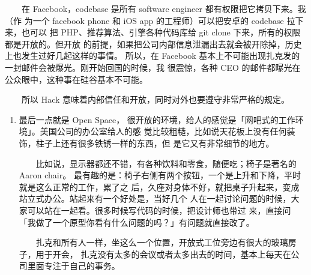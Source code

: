 \documentclass[11pt]{ctexart}
\begin{document}
　　在 Facebook，codebase 是所有 software engineer 都有权限把它拷贝下来。我（作
为一个 facebook phone 和 iOS app 的工程师）可以把安卓的 codebase 拉下来，也可以
把 PHP、推荐算法、引擎各种代码库给 git clone 下来，所有的权限都是开放的。但开放
的前提，如果把公司内部信息泄漏出去就会被开除掉，历史上也发生过好几起这样的事情。
所以，在 Facebook 基本上不可能出现扎克发的一封邮件会被爆光。刚开始回国的时候，我
很震惊，各种 CEO 的邮件都曝光在公众眼中，这种事在硅谷基本不可能。

　　所以 Hack 意味着内部信任和开放，同时对外也要遵守非常严格的规定。

\begin{enumerate}
\item 最后一点就是 Open Space，
\label{sec:orgheadline15}
很开放的环境，给人的感觉是「网吧式的工作环境」。美国公司的办公室给人的感
觉比较粗糙，比如说天花板上没有任何装饰，柱子上还有很多铁锈一样的东西，但
是它又有非常细节的地方。

　　比如说，显示器都还不错，有各种饮料和零食，随便吃；椅子是著名的 Aaron chair。
最有趣的是：椅子右侧有两个按钮，一个是上升和下降，平时就是这么正常的工作，累了之
后，久座对身体不好，就把桌子升起来，变成站立式办公。站起来有一个好处是，当好几个
人在一起讨论问题的时候，大家可以站在一起看。很多时候写代码的时候，把设计师也带过
来，直接问「我做了一个原型你看有什么问题的吗？」有问题就直接改了。

　　扎克和所有人一样，坐这么一个位置，开放式工位旁边有很大的玻璃房子，用于开会，
扎克没有太多的会议或者太多出去的时间，基本上每天在公司里面专注于自己的事务。

　
\end{enumerate}
\end{document}
